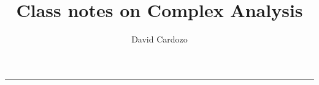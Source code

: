 \documentclass[notitlepage]{article}
\author{David Cardozo}
\title{Class notes on Complex Analysis}
\begin{document}



\noindent\rule{\textwidth}{1pt}\\[-0.1cm]


	
	
\end{document}
